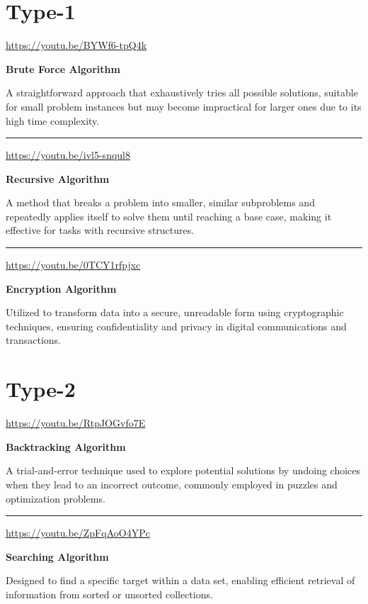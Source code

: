 \documentclass[
  letterpaper,
  DIV=11,
  numbers=noendperiod]{scrreprt}
\begin{document}
\section{Type-1}

\url{https://youtu.be/BYWf6-tpQ4k}

\textbf{Brute Force Algorithm}

A straightforward approach that exhaustively tries all possible
solutions, suitable for small problem instances but may become
impractical for larger ones due to its high time complexity.

\begin{center}\rule{0.5\linewidth}{0.5pt}\end{center}

\url{https://youtu.be/ivl5-snqul8}

\textbf{Recursive Algorithm}

A method that breaks a problem into smaller, similar subproblems and
repeatedly applies itself to solve them until reaching a base case,
making it effective for tasks with recursive structures.

\begin{center}\rule{0.5\linewidth}{0.5pt}\end{center}

\url{https://youtu.be/0TCY1rfpjxc}

\textbf{Encryption Algorithm}

Utilized to transform data into a secure, unreadable form using
cryptographic techniques, ensuring confidentiality and privacy in
digital communications and transactions.

\section{Type-2}

\url{https://youtu.be/RtpJOGvfo7E}

\textbf{Backtracking Algorithm}

A trial-and-error technique used to explore potential solutions by
undoing choices when they lead to an incorrect outcome, commonly
employed in puzzles and optimization problems.

\begin{center}\rule{0.5\linewidth}{0.5pt}\end{center}

\url{https://youtu.be/ZpFqAoO4YPc}

\textbf{Searching Algorithm}

Designed to find a specific target within a data set, enabling efficient
retrieval of information from sorted or unsorted collections.
\end{document}

